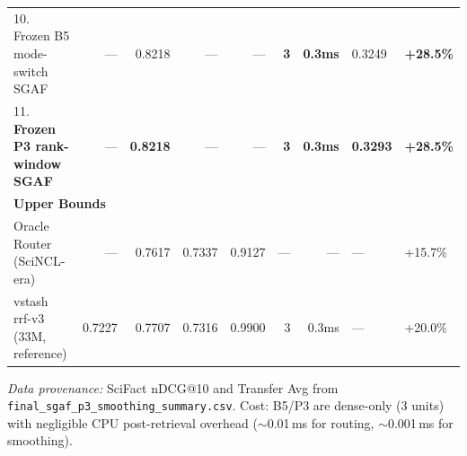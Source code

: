 \begin{table}[htbp]
{\begin{tabular}{lrrrrrrll}
\midrule
10. Frozen B5 mode-switch SGAF      & ---   & 0.8218 & ---   & ---   & \textbf{3} & \textbf{0.3ms} & 0.3249 & \textbf{+28.5\%} \\
11. \textbf{Frozen P3 rank-window SGAF} & --- & \textbf{0.8218} & --- & --- & \textbf{3} & \textbf{0.3ms} & \textbf{0.3293} & \textbf{+28.5\%} \\
\midrule
\multicolumn{9}{l}{\textbf{Upper Bounds}} \\
\midrule
Oracle Router (SciNCL-era)          & ---   & 0.7617 & 0.7337 & 0.9127 & ---   & ---      & --- & +15.7\% \\
vstash rrf-v3 (33M, reference)      & 0.7227 & 0.7707 & 0.7316 & 0.9900 & 3     & 0.3ms    & --- & +20.0\% \\
\bottomrule
\end{tabular}
}
\vspace{4pt}
\footnotesize
\textit{Data provenance:} SciFact nDCG@10 and Transfer Avg from \texttt{final\_sgaf\_p3\_smoothing\_summary.csv}. Cost: B5/P3 are dense-only (3 units) with negligible CPU post-retrieval overhead ($\sim$0.01\,ms for routing, $\sim$0.001\,ms for smoothing).
\end{table}

